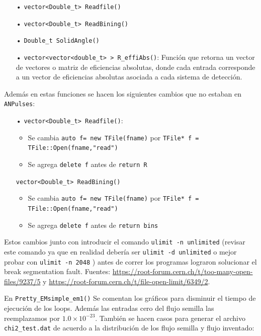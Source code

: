 \documentclass[11pt,letterpaper]{article}
\begin{document}
\begin{itemize}
\item[•] \verb|vector<Double_t> Readfile()|
\item[•] \verb|vector<Double_t> ReadBining()|
\item[•] \verb|Double_t SolidAngle()|
\item[•] \verb|vector<vector<double_t> > R_effiAbs()|: Función que retorna un vector de vectores o matriz de eficiencias absolutas, donde cada entrada corresponde a un vector de eficiencias absolutas asociada a cada sistema de detección.
\end{itemize}

Además en estas funciones se hacen los siguientes cambios que no estaban en \verb|ANPulses|:

\begin{itemize}
\item[•] \verb|vector<Double_t> Readfile()|: 
\begin{itemize}
\item Se cambia \verb|auto f= new TFile(fname)| por \verb|TFile* f = TFile::Open(fname,"read")|
\item Se agrega \verb|delete f| antes de \verb|return R| 
\end{itemize}
\verb|vector<Double_t> ReadBining()| 
\begin{itemize}
\item Se cambia \verb|auto f= new TFile(fname)| por \verb|TFile* f = TFile::Open(fname,"read")|
\item Se agrega \verb|delete f| antes de \verb|return bins| 
\end{itemize}
\end{itemize}

Estos cambios junto con introducir el comando \verb|ulimit -n unlimited| (revisar este comando ya que en realidad debería ser \verb|ulimit -d unlimited| o mejor probar con \verb|ulimit -n 2048| ) antes de correr los programas lograron solucionar el break segmentation fault. Fuentes: \url{https://root-forum.cern.ch/t/too-many-open-files/9237/5}
y \url{https://root-forum.cern.ch/t/file-open-limit/6349/2}.

En \verb|Pretty_EMsimple_em1()| Se comentan los gráficos para disminuir el tiempo de ejecución de los loops. Además las entradas cero del flujo semilla las reemplazamos por $1.0\times 10^{-23}$. También se hacen casos para generar el archivo \verb|chi2_test.dat| de acuerdo a la distribución de los flujo semilla y flujo inventado:
\end{document}

